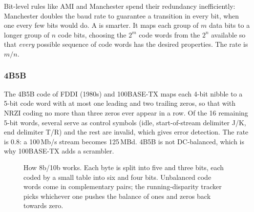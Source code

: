 Bit-level rules like AMI and Manchester spend their redundancy inefficiently: Manchester
doubles the baud rate to guarantee a transition in every bit, when one every few bits would
do. A  is smarter. It maps each group of $m$ data bits to a longer
group of $n$ code bits, choosing the $2^m$ code words from the $2^n$ available so that
\emph{every} possible sequence of code words has the desired properties. The rate is $m/n$.

\subsubsection{4B5B}
The 4B5B code of FDDI (1980s) and 100BASE-TX maps each 4-bit nibble to a 5-bit code word with
at most one leading and two trailing zeros, so that with NRZI coding no more than three zeros
ever appear in a row. Of the 16 remaining 5-bit words, several serve as control symbols
(idle, start-of-stream delimiter J/K, end delimiter T/R) and the rest are invalid, which gives
error detection. The rate is 0.8: a 100\,Mb/s stream becomes 125\,MBd. 4B5B is not
DC-balanced, which is why 100BASE-TX adds a scrambler.

\begin{figure}[htbp]\centering
{}
\caption{How 8b/10b works. Each byte is split into five and three bits, each coded by a small
table into six and four bits. Unbalanced code words come in complementary pairs; the
running-disparity tracker picks whichever one pushes the balance of ones and zeros back
towards zero.}
\label{fig:ch08_8b10b}
\end{figure}



